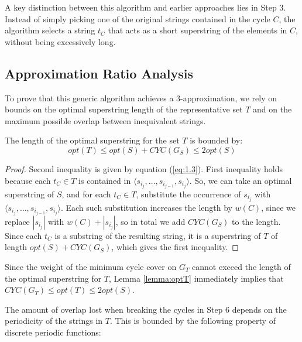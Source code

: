 A key distinction between this algorithm and earlier approaches lies in Step 3.
Instead of simply picking one of the original strings contained in the cycle
$C$, the algorithm selects a string $t_C$ that acts as a short superstring of
the elements in $C$, without being excessively long.

\subsection{Approximation Ratio Analysis}
To prove that this generic algorithm achieves a 3-approximation, we rely on
bounds on the optimal superstring length of the representative set $T$ and on
the maximum possible overlap between inequivalent strings.

\begin{lemma} \label{lemma:optT}
The length of the optimal superstring for the set $T$ is bounded by:
\begin{equation}
opt(T) \le opt(S) + CYC(G_S) \le 2opt(S)
\end{equation}
\end{lemma}
\begin{proof}
    Second inequality is given by equation (\ref{eq:1.3}). First inequality
    holds because each $t_C \in T$ is contained in $\langle s_{i_j}, \dots,
    s_{i_{j-1}}, s_{i_j} \rangle$. So, we can take an optimal superstring of
    $S$, and for each $t_C \in T$, substitute the occurrence of $s_{i_j}$ with
    $\langle s_{i_j}, \dots, s_{i_{j-1}}, s_{i_j} \rangle$. Each such
    substitution increases the length by $w(C)$, since we replace $|s_{i_j}|$
    with $w(C) + |s_{i_j}|$, so in total we add $CYC(G_S)$ to the length. Since
    each $t_C$ is a substring of the resulting string, it is a superstring of
    $T$ of length $opt(S) + CYC(G_S)$, which gives the first inequality.
\end{proof}
Since the weight of the minimum cycle cover on $G_T$ cannot exceed the length of
the optimal superstring for $T$, Lemma \ref{lemma:optT} immediately implies that
$CYC(G_T) \le opt(T) \le 2opt(S)$.

The amount of overlap lost when breaking the cycles in Step 6 depends on the
periodicity of the strings in $T$. This is bounded by the following property of
discrete periodic functions:

